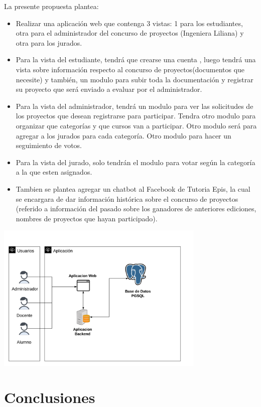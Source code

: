 \documentclass[%
 reprint,
 amsmath,amssymb,
 aps,
]{revtex4-1}
\begin{document}
La presente propuesta plantea:
\begin{itemize}
    \item Realizar una aplicación web que contenga 3 vistas: 1 para los estudiantes, otra para el administrador del concurso de proyectos (Ingeniera Liliana) y otra para los jurados.
     \item Para la vista del estudiante, tendrá que crearse una cuenta , luego tendrá una vista sobre información respecto al concurso de proyectos(documentos que necesite) y también, un modulo para subir toda la documentación y registrar su proyecto que será enviado a evaluar por el administrador.
     \item Para la vista del administrador, tendrá un modulo para ver las solicitudes de los proyectos que desean registrarse para participar. Tendra otro modulo para organizar que categorías y que cursos van a participar. Otro modulo será para agregar a los jurados para cada categoría. Otro modulo para hacer un seguimiento de votos. 
    \item Para la vista del jurado, solo tendrán el modulo para votar según la categoría a la que esten asignados.
    \item Tambien se plantea agregar un chatbot al Facebook de Tutoria Epis, la cual se encargara de dar información histórica sobre el concurso de proyectos (referido a información del pasado sobre los ganadores de anteriores ediciones, nombres de proyectos que hayan participado).
\end{itemize}
	
\begin{center}
\includegraphics[width=10cm]{./Imagenes/aq}
\end{center}

\section{Conclusiones}
\end{document}
